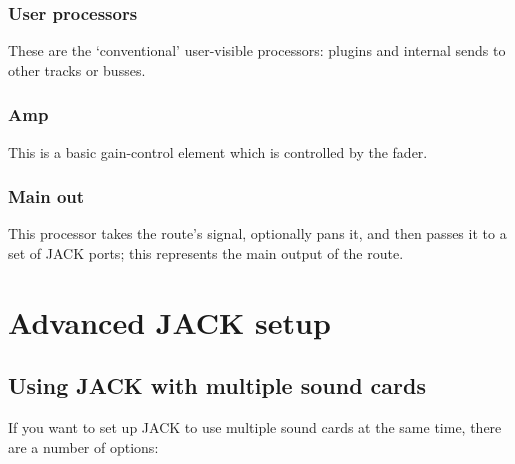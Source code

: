 \documentclass[10pt,a4paper]{book}
\begin{document}
\subsection{User processors}

These are the `conventional' user-visible processors: plugins and
internal sends to other tracks or busses.

\subsection{Amp}

This is a basic gain-control element which is controlled by the fader.

\subsection{Main out}

This processor takes the route's signal, optionally pans it, and then
passes it to a set of JACK ports; this represents the main output of
the route.


\appendix
\chapter{Advanced JACK setup}
\label{ap:advanced-jack}

\section{Using JACK with multiple sound cards}

If you want to set up JACK to use multiple sound cards at the same
time, there are a number of options:
\end{document}
